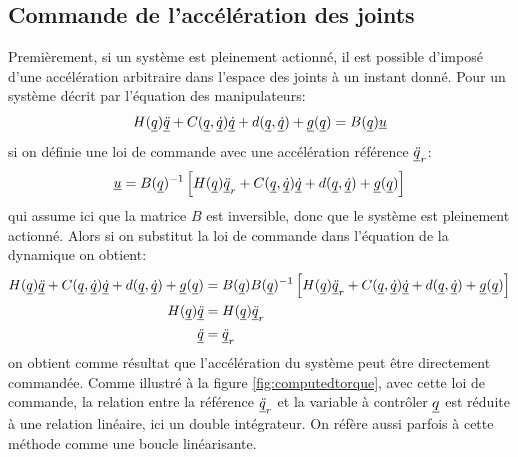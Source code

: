 

\subsection{Commande de l'accélération des joints}

Premièrement, si un système est pleinement actionné, il est possible d'imposé d'une accélération arbitraire dans l'espace des joints à un instant donné. Pour un système décrit par l'équation des manipulateurs:
\begin{align}
H(\underline{q}) \underline{\ddot{q}} + C(\underline{q},\underline{\dot{q}}) \underline{\dot{q}} + d(\underline{q}, \underline{\dot{q}}) + \underline{g}(\underline{q}) = B(\underline{q}) \underline{u} 
\end{align}
si on définie une loi de commande avec une accélération référence $\underline{\ddot{q}}_r$:
\begin{align}
\underline{u} = B(\underline{q})^{-1} \left[  H(\underline{q}) \underline{\ddot{q}}_r + C(\underline{q},\underline{\dot{q}}) \underline{\dot{q}} + d(\underline{q}, \underline{\dot{q}}) + \underline{g}(\underline{q}) \right]
\end{align}
qui assume ici que la matrice $B$ est inversible, donc que le système est pleinement actionné. Alors si on substitut la loi de commande dans l'équation de la dynamique on obtient:
\begin{align}
H(\underline{q}) \underline{\ddot{q}} + C(\underline{q},\underline{\dot{q}}) \underline{\dot{q}} + d(\underline{q}, \underline{\dot{q}}) + \underline{g}(\underline{q}) &= B(\underline{q}) B(\underline{q})^{-1} \left[  H(\underline{q}) \underline{\ddot{q}}_r + C(\underline{q},\underline{\dot{q}}) \underline{\dot{q}} + d(\underline{q}, \underline{\dot{q}}) + \underline{g}(\underline{q}) \right]  \\
H(\underline{q}) \underline{\ddot{q}} &= H(\underline{q}) \underline{\ddot{q}}_r \\
\underline{\ddot{q}} &= \underline{\ddot{q}}_r
\end{align}
on obtient comme résultat que l'accélération du système peut être directement commandée. Comme illustré à la figure \ref{fig:computedtorque}, avec cette loi de commande, la relation entre la référence $\underline{\ddot{q}}_r$ et la variable à contrôler $\underline{q}$ est réduite à une relation linéaire, ici un double intégrateur. On réfère aussi parfois à cette méthode comme une boucle linéarisante.

